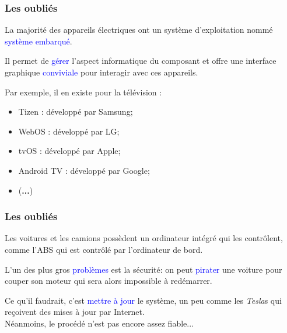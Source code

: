 \documentclass[aspectratio=169]{beamer}
\begin{document}
\begin{frame}
  \frametitle{Les oubliés}
  La majorité des appareils électriques ont un système d'exploitation nommé
  \textcolor{blue}{système embarqué}.

  \hspace{0.5cm}

  Il permet de \textcolor{blue}{gérer} l'aspect informatique du
  composant et offre une interface graphique \textcolor{blue}{conviviale} pour
  interagir avec ces appareils.

  \hspace{0.5cm}

  Par exemple, il en existe pour la télévision :

  \begin{itemize}
  \item Tizen : développé par Samsung;

  \item WebOS : développé par LG;

  \item tvOS : développé par Apple;

  \item Android TV : développé par Google;

  \item (\textbf{...})
  \end{itemize}
\end{frame}

\begin{frame}
  \frametitle{Les oubliés}
  Les voitures et les camions possèdent un ordinateur intégré qui les contrôlent,
  comme l'ABS qui est contrôlé par
  l'ordinateur de bord.

  \hspace{0.5cm}

  L'un des plus gros \textcolor{blue}{problèmes} est la sécurité: on peut
  \textcolor{blue}{pirater} une voiture pour couper son moteur qui sera alors
  impossible à redémarrer.

  \hspace{0.5cm}

  Ce qu'il faudrait, c'est \textcolor{blue}{mettre à jour} le système, un peu
  comme les \textit{Tesla}s qui reçoivent des mises à jour par Internet. \\
  Néanmoins, le procédé n'est pas encore assez fiable...
\end{frame}
\end{document}
